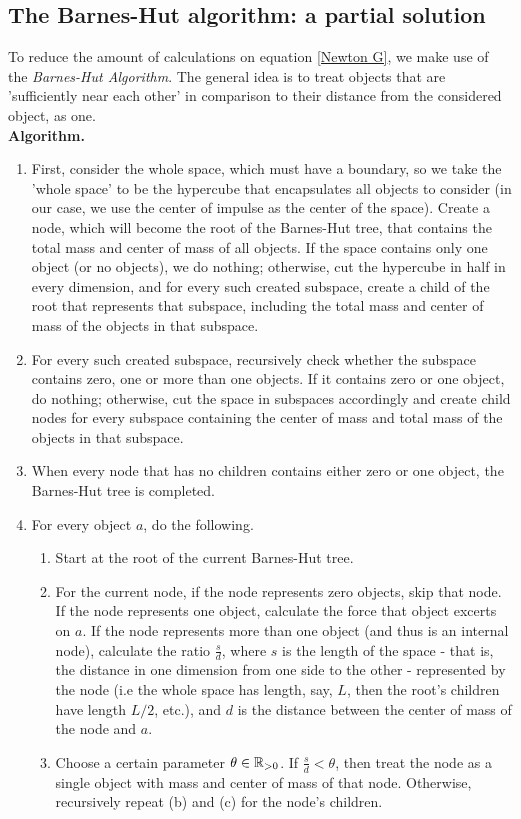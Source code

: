 \subsection{The Barnes-Hut algorithm: a partial solution}
To reduce the amount of calculations on equation \ref{Newton G}, we make use of the \textit{Barnes-Hut Algorithm}.\cite{barneshut} The general idea is to treat objects that are 'sufficiently near each other' in comparison to their distance from the considered object, as one.\\
\textbf{Algorithm.}
\begin{enumerate}
\item First, consider the whole space, which must have a boundary, so we take the 'whole space' to be the hypercube that encapsulates all objects to consider (in our case, we use the center of impulse as the center of the space). Create a node, which will become the root of the Barnes-Hut tree, that contains the total mass and center of mass of all objects. If the space contains only one object (or no objects), we do nothing; otherwise, cut the hypercube in half in every dimension, and for every such created subspace, create a child of the root that represents that subspace, including the total mass and center of mass of the objects in that subspace.
\item For every such created subspace, recursively check whether the subspace contains zero, one or more than one objects. If it contains zero or one object, do nothing; otherwise, cut the space in subspaces accordingly and create child nodes for every subspace containing the center of mass and total mass of the objects in that subspace.
\item When every node that has no children contains either zero or one object, the Barnes-Hut tree is completed.
\item For every object $a$, do the following.
\begin{enumerate}
\item Start at the root of the current Barnes-Hut tree.
\item For the current node, if the node represents zero objects, skip that node. If the node represents one object, calculate the force that object excerts on $a$. If the node represents more than one object (and thus is an internal node), calculate the ratio $\frac{s}{d}$, where $s$ is the length of the space - that is, the distance in one dimension from one side to the other - represented by the node (i.e the whole space has length, say, $L$, then the root's children have length $L/2$, etc.), and $d$ is the distance between the center of mass of the node and $a$.
\item Choose a certain parameter $\theta \in \mathbb{R}_{>0}$. If $\frac{s}{d}<\theta$, then treat the node as a single object with mass and center of mass of that node. Otherwise, recursively repeat (b) and (c) for the node's children.
\end{enumerate}
\end{enumerate}
